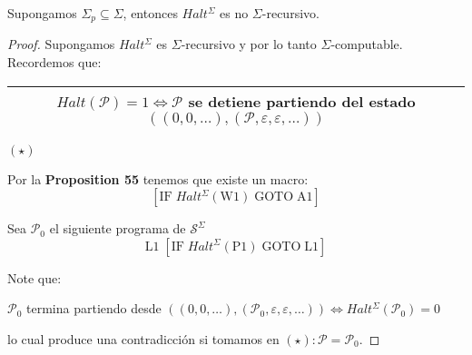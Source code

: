   \begin{lemma}
    \PN Supongamos $\Sigma_{p} \subseteq \Sigma$, entonces $Halt^{\Sigma}$ es no $\Sigma$-recursivo.
  \end{lemma}
  \begin{proof}
    \PN Supongamos $Halt^{\Sigma}$ es $\Sigma$-recursivo y por lo tanto $\Sigma$-computable. Recordemos que:

    \begin{center}
    \begin{tabular}{|c|} \hline $Halt(\mathcal{P}) = 1 \Leftrightarrow \mathcal{P}$ se detiene partiendo del estado
    $\left((0,0,\dotsc), (\mathcal{P},\varepsilon,\varepsilon,\dotsc)\right)$ \\\hline \end{tabular} $(\star)$
    \end{center}

    \PN Por la \textbf{Proposition 55} tenemos que existe un macro:
    \[
      \left[\mathrm{IF} \; Halt^{\Sigma}(\mathrm{W}1)\;\mathrm{GOTO}\;\mathrm{A}1\right]
    \]

    \PN Sea $\mathcal{P}_{0}$ el siguiente programa de $\mathcal{S}^{\Sigma}$
    \[
      \mathrm{L}1\;\left[\mathrm{IF}\;Halt^{\Sigma}(\mathrm{P}1)\;\mathrm{GOTO}\;\mathrm{L}1\right]
    \]

    \PN Note que:

    \begin{center}
      $\mathcal{P}_{0}$ termina partiendo desde $\left((0,0,\dotsc), (\mathcal{P}_{0},\varepsilon,\varepsilon,\dotsc)
      \right) \Leftrightarrow Halt^{\Sigma}(\mathcal{P}_{0}) = 0$
    \end{center}

    \PN lo cual produce una contradicción si tomamos en $(\star): \mathcal{P}= \mathcal{P}_{0}$.
  \end{proof}

